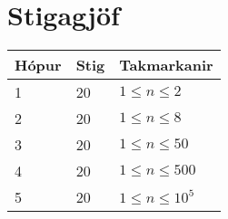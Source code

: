 \section*{Stigagjöf}
\begin{tabular}{|l|l|l|}
\hline
Hópur & Stig & Takmarkanir \\ \hline
1     & 20   & $1 \leq n \leq 2$ \\ \hline
2     & 20   & $1 \leq n \leq 8$ \\ \hline
3     & 20   & $1 \leq n \leq 50$ \\ \hline
4     & 20   & $1 \leq n \leq 500$ \\ \hline
5     & 20   & $1 \leq n \leq 10^5$ \\ \hline
\end{tabular}

